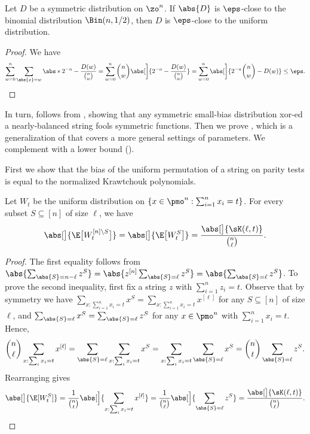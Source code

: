 \begin{claim} \label{claim:sym-close-to-bin-implies-non-sym-close}
  Let $D$ be a symmetric distribution on $\zo^n$.
  If $\abs{D}$ is $\eps$-close to the binomial distribution $\Bin(n,1/2)$, then $D$ is $\eps$-close to the uniform distribution.
\end{claim}
\begin{proof}
  We have
  \[
    \sum_{w=0}^n \sum_{\abs{x}=w} \abs*{2^{-n} - \frac{D(w)}{\binom{n}{w}}}
  = \sum_{w=0}^n \binom{n}{w} \abs[\bigg] { 2^{-n} - \frac{D(w)}{\binom{n}{w}} }
  = \sum_{w=0}^n \abs[\bigg] { 2^{-n}\binom{n}{w} - D(w)}
    \le \eps . \qedhere
  \]
\end{proof}

In turn,  follows from , showing that any symmetric small-bias distribution xor-ed a nearly-balanced string fools symmetric functions.
Then we prove , which is a generalization of  that covers a more general settings of parameters.
We complement  with a lower bound ().

First we show that the bias of the uniform permutation of a string on parity tests is equal to the normalized Krawtchouk polynomials.

\begin{claim} \label{claim:bias-unif-weight}
  Let $W_t$ be the uniform distribution on $\{x \in \pmo^n: \sum_{i=1}^n x_i = t \}$.
  For every subset $S \subseteq [n]$ of size $\ell$, we have
  \[
    \abs[\big]{ \E\bigl[ W_t^{[n]\setminus S} \bigr] }
    = \abs[\big]{ \E\bigl[ W_t^S \bigr] }
    = \frac{\abs[\big]{\sK(\ell,t)}}{\binom{n}{\ell}} .
  \]
\end{claim}
\begin{proof}
  The first equality follows from $\abs{\sum_{\abs{S}=n-\ell} z^S} = \abs{ z^{[n]} \sum_{\abs{S}=\ell} z^S } = \abs{\sum_{\abs{S}=\ell} z^S}$.
  To prove the second inequality, first fix a string $z$ with $\sum_{i=1}^n z_i = t$.
  Observe that by symmetry we have $\sum_{x: \sum_{i=1}^n x_i = t} x^S = \sum_{x: \sum_{i=1}^n x_i = t} x^{[\ell]}$ for any $S \subseteq [n]$ of size $\ell$, and $\sum_{\abs{S}=\ell} x^S = \sum_{\abs{S}=\ell} z^S$ for any $x \in \pmo^n$ with $\sum_{i=1}^n x_i = t$.
  Hence,
  \[
    \binom{n}{\ell} \sum_{x: \sum_i x_i = t} x^{[\ell]}
    = \sum_{\abs{S} = \ell} \sum_{x: \sum_i x_i = t} x^S
    = \sum_{x: \sum_i x_i = t} \sum_{\abs{S} = \ell} x^S
    = \binom{n}{t} \sum_{\abs{S}=\ell} z^S .
  \]
  Rearranging gives
  \[
    \abs[\big]{\E[W_t^S]}
    = \frac{1}{\binom{n}{t}} \abs[\Big]{ \sum_{x: \sum_i x_i = t} x^{[\ell]}} 
    = \frac{1}{\binom{n}{\ell}} \abs[\Big]{\sum_{\abs{S}=\ell} z^{S}}
    = \frac{\abs[\big]{\sK(\ell,t)}}{\binom{n}{\ell}} . \qedhere
  \]
\end{proof}

